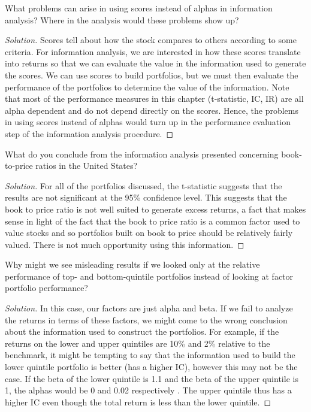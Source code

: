 \begin{problem}{12.1}
  What problems can arise in using scores instead of alphas in information analysis? Where in the analysis would these problems show up?
\end{problem}

\begin{proof}[Solution]
  Scores tell about how the stock compares to others according to some criteria. For information analysis, we are interested in how these scores translate into returns so that we can evaluate the value in the information used to generate the scores. We can use scores to build portfolios, but we must then evaluate the performance of the portfolios to determine the value of the information. Note that most of the performance measures in this chapter (t-statistic, IC, IR) are all alpha dependent and do not depend directly on the scores. Hence, the problems in using scores instead of alphas would turn up in the performance evaluation step of the information analysis procedure.
\end{proof}

\begin{problem}{12.2}
  What do you conclude from the information analysis presented concerning book-to-price ratios in the United States?
\end{problem}

\begin{proof}[Solution]
  For all of the portfolios discussed, the t-statistic suggests that the results are not significant at the 95\% confidence level. This suggests that the book to price ratio is not well suited to generate excess returns, a fact that makes sense in light of the fact that the book to price ratio is a common factor used to value stocks and so portfolios built on book to price should be relatively fairly valued. There is not much opportunity using this information.
\end{proof}

\begin{problem}{12.3}
  Why might we see misleading results if we looked only at the relative performance of top- and bottom-quintile portfolios instead of looking at factor portfolio performance?
\end{problem}

\begin{proof}[Solution]
  In this case, our factors are just alpha and beta. If we fail to analyze the returns in terms of these factors, we might come to the wrong conclusion about the information used to construct the portfolios. For example, if the returns on the lower and upper quintiles are 10\% and 2\% relative to the benchmark, it might be tempting to say that the information used to build the lower quintile portfolio is better (has a higher IC), however this may not be the case. If the beta of the lower quintile is 1.1 and the beta of the upper quintile is 1, the alphas would be 0 and 0.02 respectively . The upper quintile thus has a higher IC even though the total return is less than the lower quintile.
\end{proof}

